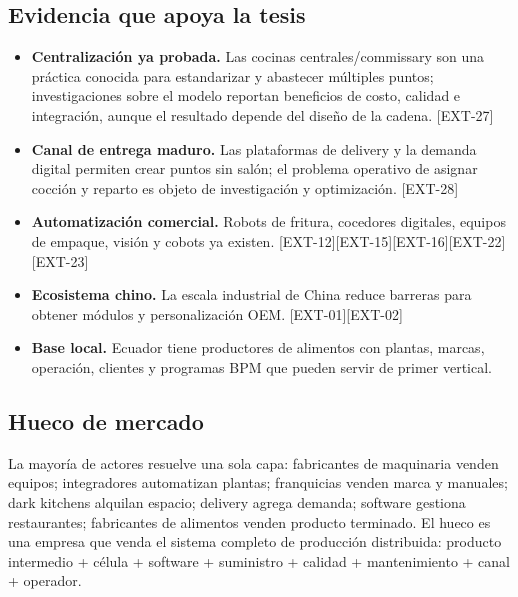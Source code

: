 \documentclass[11pt,a4paper]{article}
\begin{document}
\subsection{Evidencia que apoya la tesis}
\begin{itemize}
\item \textbf{Centralización ya probada.} Las cocinas centrales/commissary son una práctica conocida para
estandarizar y abastecer múltiples puntos; investigaciones sobre el modelo reportan beneficios de costo,
calidad e integración, aunque el resultado depende del diseño de la cadena. [EXT-27]
\item \textbf{Canal de entrega maduro.} Las plataformas de delivery y la demanda digital permiten crear
puntos sin salón; el problema operativo de asignar cocción y reparto es objeto de investigación y
optimización. [EXT-28]
\item \textbf{Automatización comercial.} Robots de fritura, cocedores digitales, equipos de empaque,
visión y cobots ya existen. [EXT-12][EXT-15][EXT-16][EXT-22][EXT-23]
\item \textbf{Ecosistema chino.} La escala industrial de China reduce barreras para obtener módulos y
personalización OEM. [EXT-01][EXT-02]
\item \textbf{Base local.} Ecuador tiene productores de alimentos con plantas, marcas, operación,
clientes y programas BPM que pueden servir de primer vertical.
\end{itemize}

\subsection{Hueco de mercado}
La mayoría de actores resuelve una sola capa: fabricantes de maquinaria venden equipos; integradores
automatizan plantas; franquicias venden marca y manuales; dark kitchens alquilan espacio; delivery agrega
demanda; software gestiona restaurantes; fabricantes de alimentos venden producto terminado. El hueco es
una empresa que venda el sistema completo de producción distribuida: producto intermedio + célula +
software + suministro + calidad + mantenimiento + canal + operador.
\end{document}
